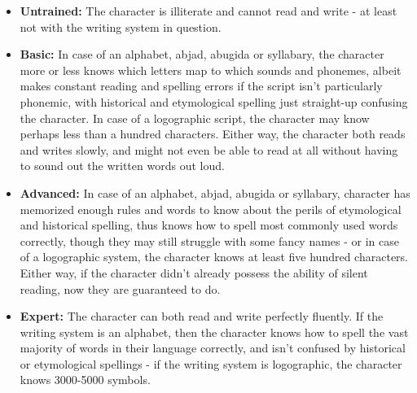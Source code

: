 \begin{itemize}
	\item \textbf{Untrained:} The character is illiterate and cannot read and write - at least not with the writing system in question.
	\item \textbf{Basic:} In case of an alphabet, abjad, abugida or syllabary, the character more or less knows which letters map to which sounds and phonemes, albeit makes constant reading and spelling errors if the script isn't particularly phonemic, with historical and etymological spelling just straight-up confusing the character. In case of a logographic script, the character may know perhaps less than a hundred characters. Either way, the character both reads and writes slowly, and might not even be able to read at all without having to sound out the written words out loud.
	\item \textbf{Advanced:} In case of an alphabet, abjad, abugida or syllabary, character has memorized enough rules and words to know about the perils of etymological and historical spelling, thus knows how to spell most commonly used words correctly, though they may still struggle with some fancy names - or in case of a logographic system, the character knows at least five hundred characters. Either way, if the character didn't already possess the ability of silent reading, now they are guaranteed to do.
	\item \textbf{Expert:} The character can both read and write perfectly fluently. If the writing system is an alphabet, then the character knows how to spell the vast majority of words in their language correctly, and isn't confused by historical or etymological spellings - if the writing system is logographic, the character knows 3000-5000 symbols.
\end{itemize}\newpage
